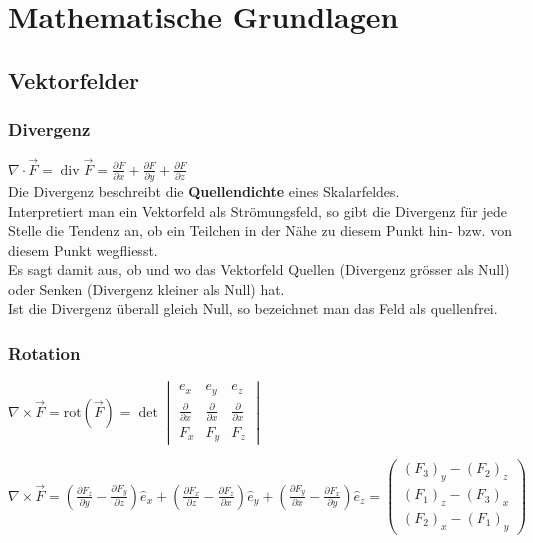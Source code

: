 \section{Mathematische Grundlagen}

\subsection{Vektorfelder}

\subsubsection{Divergenz}

$\boxed{\nabla\cdot\vec{F}=
\operatorname{div}\vec{F}=
\frac{\partial F}{\partial x}+
\frac{\partial F}{\partial y}+
\frac{\partial F}{\partial z}}$\\

Die Divergenz beschreibt die \textbf{Quellendichte} eines Skalarfeldes. \\
Interpretiert man ein Vektorfeld als Strömungsfeld,
so gibt die Divergenz für jede Stelle die Tendenz an, 
ob ein Teilchen in der Nähe zu diesem Punkt hin- bzw. von
diesem Punkt wegﬂiesst. \\
Es sagt damit aus, ob und wo das Vektorfeld Quellen (Divergenz grösser als Null) oder
Senken (Divergenz kleiner als Null) hat. \\
Ist die Divergenz überall gleich Null, so bezeichnet man das Feld als
quellenfrei.

\subsubsection{Rotation}

$\boxed{
    \nabla\times\vec{F} =
    \mathrm{rot}(\vec{F}) = 
    \det\begin{vmatrix}
    e_x                         &e_y                        &e_z\\
    \frac\partial{\partial x}   &\frac\partial{\partial x}  &\frac\partial{\partial x}\\
    F_x                         &F_y                        &F_z\end{vmatrix}}
    $

$\boxed{\nabla\times\vec{F} =
            \left(\frac{\partial F_{z}}{\partial y}-\frac{\partial F_{y}}{\partial z}\right)\hat{e}_{x}+
            \left(\frac{\partial F_{x}}{\partial z}-\frac{\partial F_{z}}{\partial x}\right)\hat{e}_{y}+
            \left(\frac{\partial F_{y}}{\partial x}-\frac{\partial F_{x}}{\partial y}\right)\hat{e}_{z}=
            \begin{pmatrix}
                (F_3)_y-(F_2)_z\\
                (F_1)_z-(F_3)_x\\
                (F_2)_x-(F_1)_y
            \end{pmatrix}
}$\\

